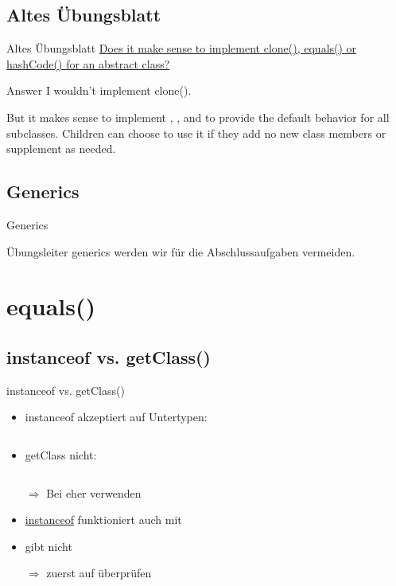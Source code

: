 \documentclass[usepdftitle=false,hyperref={pdfpagelabels=false}]{beamer}
\begin{document}
\subsection{Altes Übungsblatt}
\begin{frame}{Altes Übungsblatt}
   \href{http://stackoverflow.com/q/14200941/562769}{Does it make sense to implement clone(), equals() or hashCode() for an abstract class?}

    \begin{block}{Answer}
        I wouldn't implement clone().

        But it makes sense to implement ,
        , and
         to provide the default behavior for all subclasses.
        Children can choose to use it if they add no new class
        members or supplement as needed.
    \end{block}
\end{frame}

\subsection{Generics}
\begin{frame}{Generics}
   \begin{block}{Übungsleiter}
        generics werden wir für die Abschlussaufgaben vermeiden.
    \end{block}
\end{frame}

\section{equals()}
\subsection{instanceof vs. getClass()}
\begin{frame}{instanceof vs. getClass()}
    \begin{itemize}[<+->]
        \item instanceof akzeptiert auf Untertypen:
              \inputminted[linenos=false, numbersep=5pt, tabsize=4, fontsize=\tiny, firstline=8, lastline=15]{java}{singleLines.java}
        \item getClass nicht:
              \inputminted[linenos=false, numbersep=5pt, tabsize=4, fontsize=\tiny, firstline=17, lastline=18]{java}{singleLines.java}
        \item[$\Rightarrow$] Bei  eher  verwenden
        \item \href{http://docs.oracle.com/javase/specs/jls/se7/html/jls-15.html\#jls-15.20.2}{instanceof} funktioniert auch mit 
        \item {} gibt  nicht
        \item[$\Rightarrow$] zuerst auf  überprüfen
    \end{itemize}
\end{frame}
\end{document}
